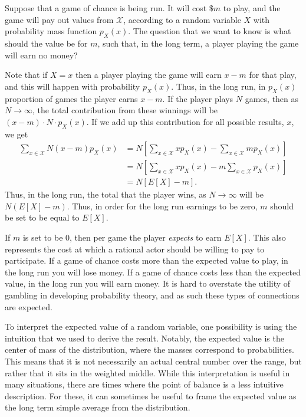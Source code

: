 \documentclass[
  letterpaper,
  DIV=11,
  numbers=noendperiod]{scrreprt}
\theoremstyle{definition}
\theoremstyle{definition}
\theoremstyle{definition}
\theoremstyle{remark}
\begin{document}
\begin{tcolorbox}[enhanced jigsaw, coltitle=black, colframe=quarto-callout-tip-color-frame, colbacktitle=quarto-callout-tip-color!10!white, bottomrule=.15mm, opacitybacktitle=0.6, colback=white, toptitle=1mm, arc=.35mm, leftrule=.75mm, bottomtitle=1mm, opacityback=0, breakable, rightrule=.15mm, title={Cost for a Game of Chance}, left=2mm, titlerule=0mm, toprule=.15mm]

Suppose that a game of chance is being run. It will cost \(\$m\) to
play, and the game will pay out values from \(\mathcal{X}\), according
to a random variable \(X\) with probability mass function \(p_X(x)\).
The question that we want to know is what should the value be for \(m\),
such that, in the long term, a player playing the game will earn no
money?

Note that if \(X=x\) then a player playing the game will earn \(x - m\)
for that play, and this will happen with probability \(p_X(x)\). Thus,
in the long run, in \(p_X(x)\) proportion of games the player earns
\(x-m\). If the player plays \(N\) games, then as \(N\to\infty\), the
total contribution from these winnings will be
\((x-m)\cdot N\cdot p_X(x)\). If we add up this contribution for all
possible results, \(x\), we get \begin{align*}
\sum_{x\in\mathcal{X}} N(x-m)p_X(x) &= N\left[\sum_{x\in\mathcal{X}}xp_X(x) - \sum_{x\in\mathcal{X}} mp_X(x)\right] \\
&= N\left[\sum_{x\in\mathcal{X}}xp_X(x) - m\sum_{x\in\mathcal{X}}p_X(x)\right] \\
&= N\left[E[X] - m\right].
\end{align*} Thus, in the long run, the total that the player wins, as
\(N\to\infty\) will be \(N(E[X] - m)\). Thus, in order for the long run
earnings to be zero, \(m\) should be set to be equal to \(E[X]\).

If \(m\) is set to be \(0\), then per game the player \emph{expects} to
earn \(E[X]\). This also represents the cost at which a rational actor
should be willing to pay to participate. If a game of chance costs more
than the expected value to play, in the long run you will lose money. If
a game of chance costs less than the expected value, in the long run you
will earn money. It is hard to overstate the utility of gambling in
developing probability theory, and as such these types of connections
are expected.

\end{tcolorbox}

To interpret the expected value of a random variable, one possibility is
using the intuition that we used to derive the result. Notably, the
expected value is the center of mass of the distribution, where the
masses correspond to probabilities. This means that it is not
necessarily an actual central number over the range, but rather that it
sits in the weighted middle. While this interpretation is useful in many
situations, there are times where the point of balance is a less
intuitive description. For these, it can sometimes be useful to frame
the expected value as the long term simple average from the
distribution.
\end{document}
